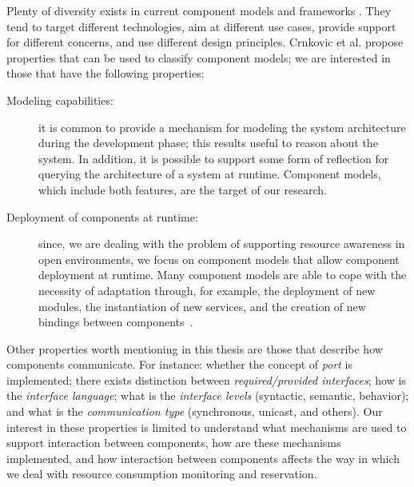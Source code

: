 Plenty of diversity exists in current component models and frameworks \cite{Heineman2001, SZYPERSKI2002, Crnkovic2011}.
They tend to target different technologies, aim at different use cases, provide support for different concerns, and use different design principles.
Crnkovic et al. \cite{Crnkovic2011} propose properties that can be used to classify component models; we are interested in those that have the following properties:

\begin{description}
\item[Modeling capabilities:] it is common to provide a mechanism for modeling the system architecture during the development phase; this results useful to reason about the system.
In addition, it is possible to support some form of reflection for querying the architecture of a system at runtime.
Component models, which include both features, are the target of our research.

\item[Deployment of components at runtime:] since, we are dealing with the problem of supporting resource awareness in open environments, we focus on component models that allow component deployment at runtime.
Many component models are able to cope with the necessity of adaptation through, for example, the deployment of new modules, the instantiation of new services, and the creation of new bindings between components~\cite{Porter:2014:RMC:2602458.2602471, Zheng:2014:RCC:2679601.2680405, Irmert:2008:RAS:1370018.1370036, Ghezzi:2010:QDD:2163764.2163774}.
\end{description}

Other properties worth mentioning in this thesis are those that describe how components communicate.
For instance:  whether the concept of \textit{port} is implemented; there exists distinction between \textit{required/provided interfaces}; how is the \textit{interface language}; what is the \textit{interface levels} (syntactic, semantic, behavior); and what is the \textit{communication type} (synchronous, unicast, and others).
Our interest in these properties is limited to understand what mechanisms are used to support interaction between components, how are these mechanisms implemented, and how interaction between components affects the way in which we deal with resource consumption monitoring and reservation.

